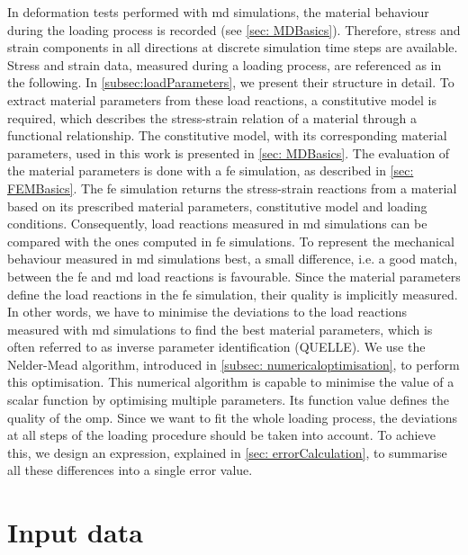 In deformation tests performed with \acrshort{md} simulations, the material behaviour during the loading process is recorded (see \autoref{sec: MDBasics}). Therefore, stress and strain components in all directions at discrete simulation time steps are available. Stress and strain data, measured during a loading process, are referenced as  in the following.
In \autoref{subsec:loadParameters}, we present their structure in detail. To extract material parameters from these load reactions, a constitutive model is required, which describes the stress-strain relation of a material through a functional relationship.
The constitutive model, with its corresponding material parameters, used in this work is presented in \autoref{sec: MDBasics}.  
The evaluation of the material parameters is done with a \acrshort{fe} simulation, as described in \autoref{sec: FEMBasics}.
The \acrshort{fe} simulation returns the stress-strain reactions from a material based on its prescribed material parameters, constitutive model and loading conditions.
Consequently, load reactions measured in \acrshort{md} simulations can be compared with the ones computed in \acrshort{fe} simulations.
To represent the mechanical behaviour measured in \acrshort{md} simulations best, a small difference, i.e. a good match, between the \acrshort{fe} and \acrshort{md} load reactions is favourable. Since the material parameters define the load reactions in the \acrshort{fe} simulation, their quality is implicitly measured.
In other words, we have to minimise the deviations to the load reactions measured with \acrshort{md} simulations to find the best material parameters, which is often referred to as inverse parameter identification (QUELLE). We use the Nelder-Mead algorithm, introduced in \autoref{subsec: numericaloptimisation}, to perform this optimisation. This numerical algorithm is capable to minimise the value of a scalar function by optimising multiple parameters. 
Its function value defines the quality of the \acrlong{omp}.
Since we want to fit the whole loading process, the deviations at all steps of the loading procedure should be taken into account. To achieve this, we design an expression, explained in \autoref{sec: errorCalculation}, to summarise all these differences into a single error value.

\section{Input data} \label{sec: inputData}

